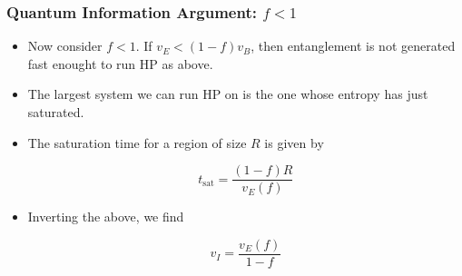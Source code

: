 \documentclass[10pt,aspectratio=169]{beamer}
\begin{document}
\begin{frame}
\frametitle{Quantum Information Argument: $f<1$}


\begin{itemize}

\item Now consider $f<1$. If $v_E < (1-f) v_B$, then entanglement is not generated fast enought to run HP as above.

\item The largest system we can run HP on is the one whose entropy has just saturated.

\item The saturation time for a region of size $R$ is given by

\begin{equation}
t_{\text{sat}} = \frac{(1-f) R}{v_E(f)} 
\end{equation}

\item Inverting the above, we find

\begin{equation}
v_I = \frac{v_E(f)}{1-f}
\end{equation}

\end{itemize}

%

    
    


\end{frame}
\end{document}
